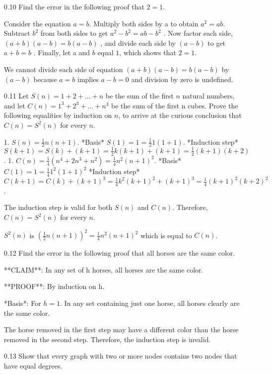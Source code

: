 \documentclass[12pt, a4paper]{article}
\begin{document}
\begin{enumerate}

    \item[0.10]
Find the error in the following proof that $2 = 1$. 

Consider the equation $a = b$. Multiply both sides by a to obtain 
$a^2 = ab$. 
Subtract 
$b^2$ 
from both sides to get 
$a^2 - b^2 = ab - b^2$
. Now factor each side, 
$(a + b)(a - b) = b(a - b)$
, and divide each side by 
$(a - b)$ 
to get 
$a + b = b$
. Finally, let a and $b$ equal $1$, which shows that $2 = 1$.


We cannot divide each side of equation $(a + b)(a - b) = b(a - b)$ by $(a - b)$ because $a = b$ implies $a - b = 0$ and division by zero is undefined.

    \item[0.11]
Let $S(n) = 1 + 2 + \ldots + n$ be the sum of the first $n$ natural numbers, and let $C(n) = 1^3 + 2^3 + \ldots + n^3$ be the sum of the first n cubes. Prove the following equalities by induction on $n$, to arrive at the curious conclusion that $C(n) = S^2(n)$ for every $n$.

1. $S(n) = \frac{1}{2} n(n+1)$.
*Basis*
$ S(1) = 1 = \frac{1}{2} 1(1+1)$.
*Induction step*
$ S(k+1) = S(k) + (k+1) = \frac{1}{2} k(k+1) + (k+1) = \frac{1}{2} (k+1)(k+2)$.
1. $C(n) = \frac{1}{4}(n^4 + 2n^3 + n^2) = \frac{1}{4} n^2(n+1)^2$.
*Basis*
$ C(1) = 1 = \frac{1}{4} 1^2(1+1)^2$
*Induction step*
$ C(k+1) = C(k) + (k+1)^3 = \frac{1}{4} k^2(k+1)^2 + (k+1)^3 = \frac{1}{4} (k+1)^2(k+2)^2$.

The induction step is valid for both $S(n)$ and $C(n)$. Therefore, $C(n) = S^2(n)$ for every $n$.

$S^2(n)$ is $(\frac{1}{2} n(n+1))^2 = \frac{1}{4} n^2(n+1)^2$ which is equal to $C(n)$.

    \item[0.12]
Find the error in the following proof that all horses are the same color.

**CLAIM**: In any set of h horses, all horses are the same color.

**PROOF**: By induction on h.

*Basis*: For $h = 1$. In any set containing just one horse, all horses clearly are the same color.

The horse removed in the first step may have a different color than the horse removed in the second step. Therefore, the induction step is invalid.

\item[0.13]
Show that every graph with two or more nodes contains two nodes that have equal degrees.


\end{enumerate}
\end{document}
